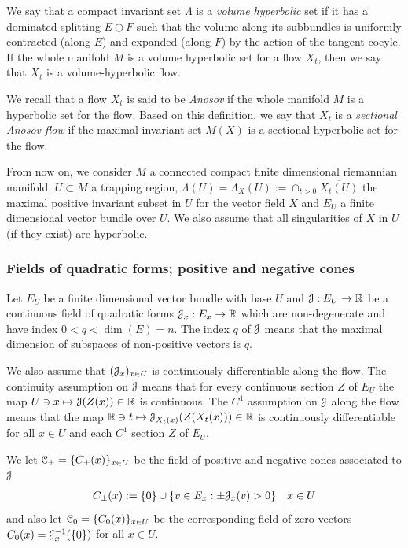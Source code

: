 \documentclass[12pt,reqno]{amsart}
\numberwithin{equation}{section}
\theoremstyle{plain}
\theoremstyle{definition}
\newcommand{\RR}{{\mathbb R}}
\newcommand{\cC}{\EuScript{C}}
\newcommand{\J}{\EuScript{J}}
\begin{document}
We say that a compact invariant set $\Lambda$ is a
\emph{volume hyperbolic} set if it has a dominated splitting
$E\oplus F$ such that the volume along its subbundles is
uniformly contracted (along $E$) and expanded (along $F$) by
the action of the tangent cocyle. If the whole manifold $M$
is a volume hyperbolic set for a flow $X_t$, then we say
that $X_t$ is a volume-hyperbolic flow.

We recall that a flow $X_t$ is said to be \emph{Anosov} if
the whole manifold $M$ is a hyperbolic set for the flow.
Based on this definition, we say that $X_t$ is a
\emph{sectional Anosov flow} if the maximal invariant set
$M(X)$ is a sectional-hyperbolic set for the flow.

From now on, we consider $M$ a connected compact finite
dimensional riemannian manifold, $U \subset M$ a trapping
region, $\Lambda(U)=\Lambda_X(U):= \cap_{t>0}\overline
{X_t(U)}$ the maximal positive invariant subset in $U$ for
the vector field $X$ and $E_U$ a finite dimensional vector
bundle over $U$.  We also assume that all singularities of
$X$ in $U$ (if they exist) are hyperbolic.

\subsubsection{Fields of quadratic forms; positive and
  negative cones}
\label{sec:fields-quadrat-forms}

Let $E_U$ be a finite dimensional vector bundle with base
$U$ and $\J:E_U\to\RR$ be a continuous field of quadratic
forms $\J_x:E_x\to\RR$ which are non-degenerate and have
index $0<q<\dim(E)=n$.  The index $q$ of $\J$ means that the
maximal dimension of subspaces of non-positive vectors is
$q$.

We also assume that $(\J_x)_{x\in U}$ is continuously
differentiable along the flow.  The continuity assumption on
$\J$ means that for every continuous section $Z$ of $E_U$
the map $U\ni x\mapsto \J(Z(x))\in\RR$ is
continuous. The $C^1$ assumption on $\J$ along the flow
means that the map $\RR\ni t\mapsto \J_{X_t(x)} (Z(X_t(x)))\in \RR$
is continuously differentiable for all $x\in U$ and each
$C^1$ section $Z$ of $E_U$.

We let $\cC_\pm=\{C_\pm(x)\}_{x\in U}$ be the field of
positive and negative cones associated to $\J$
\begin{align*}
  C_\pm(x):=\{0\}\cup\{v\in E_x: \pm\J_x(v)>0\}  \quad x\in U
\end{align*}
and also let $\cC_0=\{C_0(x)\}_{x\in U}$ be the corresponding
field of zero vectors $C_0(x)=\J_x^{-1}(\{0\})$ for all
$x\in U$.
\end{document}

